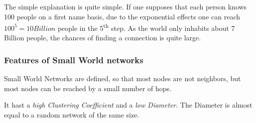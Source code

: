 The simple explanation is quite simple.
If one supposes that each person knows 100 people on a first name basis,
due to the exponential effects one can reach $100^5 = 10 Billion$ people in the 5\textsuperscript{th} step.
As the world only inhabits about 7 Billion people,
the chances of finding a connection is quite large.

\subsubsection{Features of Small World networks} %
\label{ssub:features_of_small_world_networks}
	Small World Networks are defined,
	so that most nodes are not neighbors,
	but most nodes can be reached by a small number of hops.

	It hast a \emph{high Clustering Coefficient}
	and a \emph{low Diameter}.
	The Diameter is almost equal to a random network of the same size.

